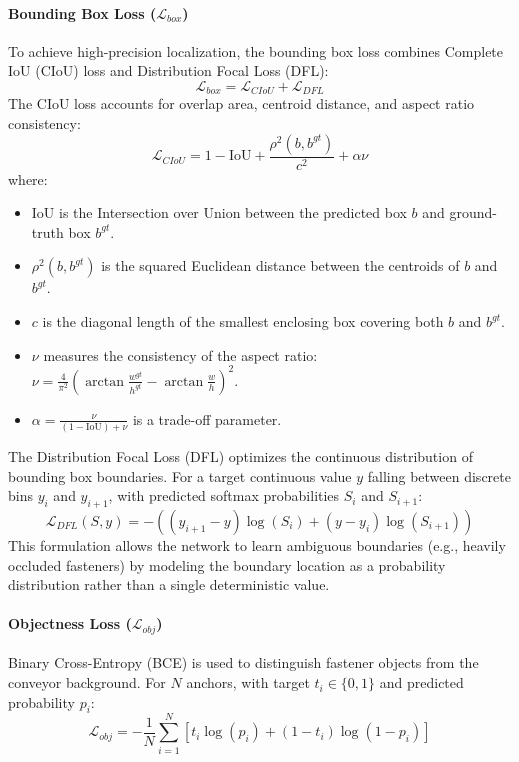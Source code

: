 \paragraph{Bounding Box Loss ($\mathcal{L}_{box}$)}
To achieve high-precision localization, the bounding box loss combines Complete IoU (CIoU) loss and Distribution Focal Loss (DFL):
\begin{equation}
    \mathcal{L}_{box} = \mathcal{L}_{CIoU} + \mathcal{L}_{DFL}
\end{equation}
The CIoU loss accounts for overlap area, centroid distance, and aspect ratio consistency:
\begin{equation}
    \mathcal{L}_{CIoU} = 1 - \text{IoU} + \frac{\rho^2(b, b^{gt})}{c^2} + \alpha \nu
\end{equation}
where:
\begin{itemize}
    \item $\text{IoU}$ is the Intersection over Union between the predicted box $b$ and ground-truth box $b^{gt}$.
    \item $\rho^2(b, b^{gt})$ is the squared Euclidean distance between the centroids of $b$ and $b^{gt}$.
    \item $c$ is the diagonal length of the smallest enclosing box covering both $b$ and $b^{gt}$.
    \item $\nu$ measures the consistency of the aspect ratio: $\nu = \frac{4}{\pi^2} \left( \arctan\frac{w^{gt}}{h^{gt}} - \arctan\frac{w}{h} \right)^2$.
    \item $\alpha = \frac{\nu}{(1 - \text{IoU}) + \nu}$ is a trade-off parameter.
\end{itemize}

The Distribution Focal Loss (DFL) optimizes the continuous distribution of bounding box boundaries. For a target continuous value $y$ falling between discrete bins $y_i$ and $y_{i+1}$, with predicted softmax probabilities $S_i$ and $S_{i+1}$:
\begin{equation}
    \mathcal{L}_{DFL}(S, y) = -\left( (y_{i+1} - y) \log(S_i) + (y - y_i) \log(S_{i+1}) \right)
\end{equation}
This formulation allows the network to learn ambiguous boundaries (e.g., heavily occluded fasteners) by modeling the boundary location as a probability distribution rather than a single deterministic value.

\paragraph{Objectness Loss ($\mathcal{L}_{obj}$)}
Binary Cross-Entropy (BCE) is used to distinguish fastener objects from the conveyor background. For $N$ anchors, with target $t_i \in \{0, 1\}$ and predicted probability $p_i$:
\begin{equation}
    \mathcal{L}_{obj} = -\frac{1}{N} \sum_{i=1}^{N} \left[ t_i \log(p_i) + (1 - t_i) \log(1 - p_i) \right]
\end{equation}

